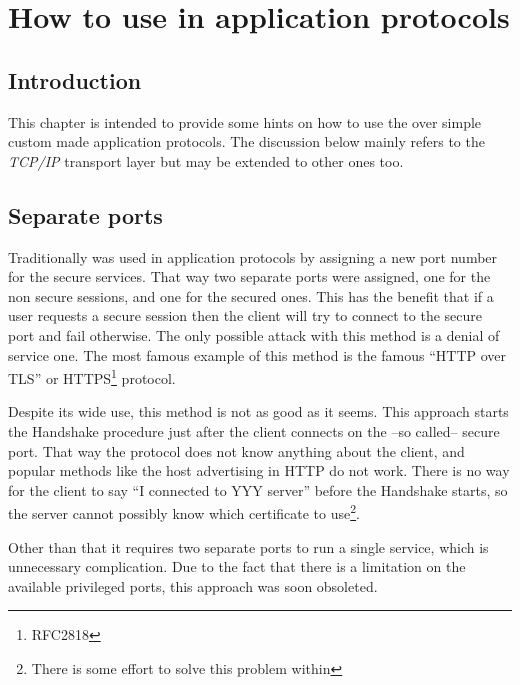 \chapter{How to use \tls{} in application protocols}
\label{apps}

\section{Introduction}
This chapter is intended to provide some hints on how to use the \tls{}
over simple custom made application protocols. 
The discussion below mainly refers to the \emph{TCP/IP} transport layer
but may be extended to other ones too.

\section{Separate ports}

Traditionally \ssl{} was used in application protocols by assigning 
a new port number for the secure services. That way two separate 
ports were assigned, one for the
non secure sessions, and one for the secured ones. This has the benefit
that if a user requests a secure session then the client will try to
connect to the secure port and fail otherwise. The only possible attack
with this method is a denial of service one. The most famous
example of this method is the famous ``HTTP over TLS'' or HTTPS\footnote{RFC2818} 
protocol.
\par
Despite its wide use, this method is not as good as it seems.
This approach starts the \tls{} Handshake procedure just after the
client connects on the --so called-- secure port. 
That way the \tls{} protocol does not know anything
about the client, and popular methods like the host advertising in 
HTTP do not work. There is no way for the client to say ``I connected
to YYY server'' before the Handshake starts, so the server cannot
possibly know which certificate to use\footnote{There is some effort to solve
this problem within \tls{}}.

\par
Other than that it requires two separate ports to run a single service, which is 
unnecessary complication. Due to the fact that there is a limitation on 
the available privileged ports, this approach was soon obsoleted.


